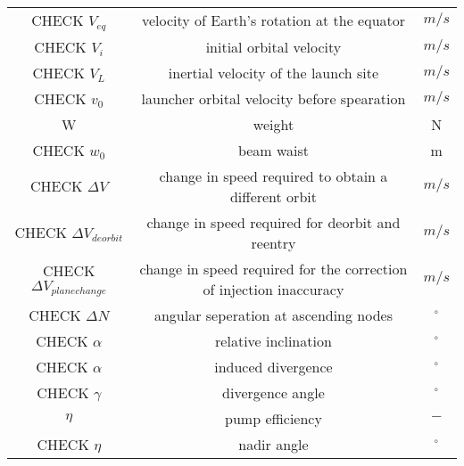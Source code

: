 \documentclass[11pt]{report}
\begin{document}
\begin{center}
\begin{longtable}{c|c|c}
CHECK $V_{eq}$                            & velocity of Earth's rotation at the equator & $m/s$ \\

CHECK $V_i$                               & initial orbital velocity      & $m/s$ \\

CHECK $V_L$                               & inertial velocity of the launch site        & $m/s$ \\

CHECK $v_0$                               & launcher orbital velocity before spearation & $m/s$ \\

W 																	& weight 																			& N \\

CHECK $w_0$                       & beam waist                                      & m \\

CHECK $\Delta V$                           & change in speed required to obtain a different orbit & $m/s$ \\

CHECK $\Delta V_{deorbit}$                      & change in speed required for deorbit and reentry         & $m/s$ \\ 

CHECK $\Delta V_{planechange}$                      & change in speed required for the correction of injection inaccuracy         & $m/s$ \\ 

CHECK $\Delta N$                               & angular seperation at ascending nodes            & $^\circ$ \\    

CHECK $\alpha$                            & relative inclination                        & $^\circ$ \\

CHECK $\alpha$                            & induced divergence                       & $^\circ$ \\

CHECK $\gamma$                             & divergence angle                         & $^\circ$ \\  

$\eta$ 															& pump efficiency 														& $-$ \\

CHECK $\eta$ 															& nadir angle														& $^\circ$ \\


\end{longtable}
\end{center}
\end{document}
